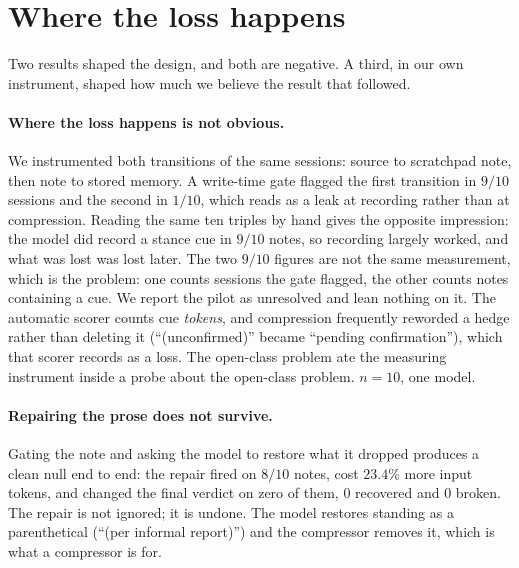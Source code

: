 \documentclass[11pt]{article}
\begin{document}
\section{Where the loss happens}
\label{sec:negatives}

Two results shaped the design, and both are negative. A third, in our own instrument,
shaped how much we believe the result that followed.

\paragraph{Where the loss happens is not obvious.} We instrumented both transitions of
the same sessions: source to scratchpad note, then note to stored memory. A write-time
gate flagged the first transition in $9/10$ sessions and the second in $1/10$, which reads
as a leak at recording rather than at compression. Reading the same ten triples by hand
gives the opposite impression: the model did record a stance cue in $9/10$ notes, so
recording largely worked, and what was lost was lost later. The two $9/10$ figures are not
the same measurement, which is the problem: one counts sessions the gate flagged, the
other counts notes containing a cue. We report the pilot as unresolved and lean nothing
on it. The automatic scorer counts cue \emph{tokens}, and compression frequently
reworded a hedge rather than deleting it (``(unconfirmed)'' became ``pending
confirmation''), which that scorer records as a loss.
The open-class problem ate the measuring instrument inside a probe about the open-class
problem. $n=10$, one model.

\paragraph{Repairing the prose does not survive.} Gating the note and asking the model to
restore what it dropped produces a clean null end to end:
the repair fired on $8/10$ notes, cost $23.4\%$ more input tokens, and changed the final
verdict on zero of them, $0$ recovered and $0$ broken. The repair is not ignored; it is
undone. The model restores standing as a parenthetical (``(per informal report)'') and the
compressor removes it, which is what a compressor is for.
\end{document}
